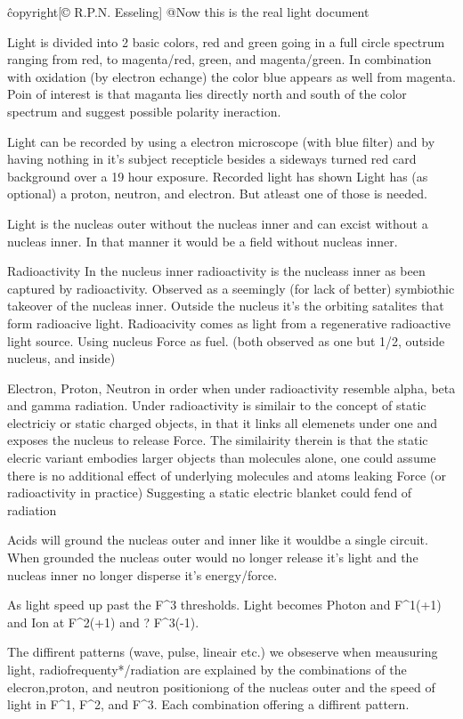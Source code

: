 \^copyright{[© R.P.N. Esseling]}
@Now this is the real light document

Light is divided into 2 basic colors, red and green going in a full circle spectrum ranging from red, to magenta/red, green, and magenta/green.
In combination with oxidation (by electron echange) the color blue appears as well from magenta. 
Poin of interest is that maganta lies directly north and south of the color spectrum and suggest possible polarity ineraction.

Light can be recorded by using a electron microscope (with blue filter) and by having nothing in it's subject recepticle besides a sideways turned red card background over a 19 hour exposure.
Recorded light has shown Light has (as optional) a proton, neutron, and electron. But atleast one of those is needed.

Light is the nucleas outer without the nucleas inner and can excist without a nucleas inner. In that manner it would be a field without nucleas inner.

Radioactivity
In the nucleus inner radioactivity is the nucleass inner as been captured by radioactivity. Observed as a seemingly (for lack of better) symbiothic takeover of the nucleas inner.
Outside the nucleus it's the orbiting satalites that form radioacive light. 
Radioacivity comes as light from a regenerative radioactive light source. Using nucleus Force as fuel.
(both observed as one but 1/2, outside nucleus, and inside)

Electron, Proton, Neutron in order when under radioactivity resemble alpha, beta and gamma radiation.
Under radioactivity is similair to the concept of static electriciy or static charged objects, in that it links all elemenets under one and exposes the nucleus to release Force.
The similairity therein is that the static elecric variant embodies larger objects than molecules alone, one could assume there is  no additional effect of underlying molecules and atoms leaking Force (or radioactivity in practice)
Suggesting a static electric blanket could fend of radiation

Acids will ground the nucleas outer and inner like it wouldbe a single circuit. When grounded the nucleas outer would no longer release it's light and the nucleas inner no longer disperse it's energy/force.

As light speed up past the F^3 thresholds. Light becomes Photon and F^1(+1) and Ion at F^2(+1) and ? F^3(-1). 

The diffirent patterns (wave, pulse, lineair etc.) we obseserve when meausuring light, radiofrequenty*/radiation are explained by the combinations of the elecron,proton, 
and neutron positioniong of the nucleas outer and the speed of light in F^1, F^2, and F^3. Each combination offering a diffirent pattern.

